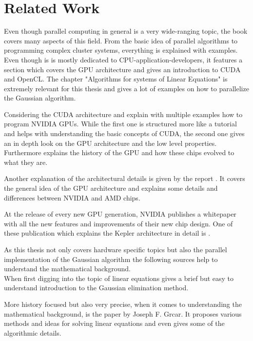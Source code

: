 \documentclass[draft, final]{vutinfth} %
\begin{document}
\chapter{Related Work}
	Even though parallel computing in general is a very wide-ranging topic, the book \cite{opac-b1133063} covers many aspects of this field. From the basic idea of parallel algorithms to programming complex cluster systems, everything is explained with examples. Even though is is mostly dedicated to CPU-application-developers, it features a section which covers the GPU architecture and gives an introduction to CUDA and OpenCL. The chapter "Algorithms for systems of Linear Equations" is extremely relevant for this thesis and gives a lot of examples on how to parallelize the Gaussian algorithm.

	Considering the CUDA architecture \cite{Sanders:2010:CEI:1891996} and \cite{Kirk:2010:PMP:1841511} explain with multiple examples how to program NVIDIA GPUs. While the first one is structured more like a tutorial and helps with understanding the basic concepts of CUDA, the second one gives an in depth look on the GPU architecture and the low level properties. Furthermore \cite{Kirk:2010:PMP:1841511} explains the history of the GPU and how these chips evolved to what they are.

	Another explanation of the architectural details is given by the report \cite{Introduction-to-GPUs}. It covers the general idea of the GPU architecture and explains some details and differences between NVIDIA and AMD chips.

	At the release of every new GPU generation, NVIDIA publishes a whitepaper with all the new features and improvements of their new chip design. One of these publication which explains the Kepler architecture in detail is \cite{nvidia_kepler_2012}.

	As this thesis not only covers hardware specific topics but also the parallel implementation of the Gaussian algorithm the following sources help to understand the mathematical background.\\
	When first digging into the topic of linear equations \cite{wiki:gaussian} gives a brief but easy to understand introduction to the Gaussian elimination method.

	More history focused but also very precise, when it comes to understanding the mathematical background, is the paper \cite{Grcar2011163} by Joseph F. Grcar. It proposes various methods and ideas for solving linear equations and even gives some of the algorithmic details.
\end{document}
